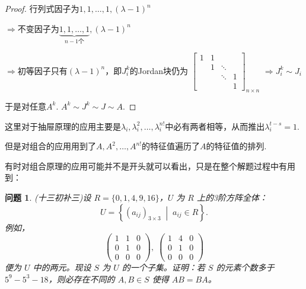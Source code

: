 \documentclass[12pt]{ctexart}  %
\newtheorem{question}{问题}[]
\begin{document}
\begin{proof}
行列式因子为$1,1,\dots,1,(\lambda-1)^n$

$\Rightarrow$不变因子为$\underbrace{1,1,\dots,1}_{n-1\text{个}},(\lambda-1)^n$

$\Rightarrow$初等因子只有$(\lambda-1)^n$，即$J_i^k$的Jordan块仍为
$\begin{bmatrix}
1 & 1 & & \\
& 1 & \ddots & \\
& & \ddots & 1 \\
& & & 1
\end{bmatrix}_{n\times n}$
$\Rightarrow J_i^k\sim J_i$

于是对任意$A^k$. $A^k\sim J^k\sim J\sim A$.


\end{proof}
这里对于抽屉原理的应用主要是$\lambda_i,\lambda_i^2,\dots,\lambda_i^{n!}$中必有两者相等，从而推出$\lambda_i^{t-s}=1$.

但是对组合的应用用到了$A,A^2,\dots,A^{n!}$的特征值遍历了$A$的特征值的排列.


有时对组合原理的应用可能并不是开头就可以看出，只是在整个解题过程中有用到：



\begin{question}
(十三初补三)设 \(R = \{0,1,4,9,16\}\)，\(U\) 为 \(R\) 上的3阶方阵全体：
\[
U = \left\{ (a_{ij})_{3\times 3} \;\middle|\; a_{ij} \in R \right\}.
\]
例如，
\[
\begin{pmatrix}
1 & 1 & 0 \\
0 & 1 & 0 \\
0 & 0 & 0
\end{pmatrix},\;
\begin{pmatrix}
1 & 4 & 0 \\
0 & 1 & 0 \\
0 & 0 & 0
\end{pmatrix}
\]
便为 \(U\) 中的两元。现设 \(S\) 为 \(U\) 的一个子集。证明：若 \(S\) 的元素个数多于 \(5^9 - 5^3 - 18\)，则必存在不同的 \(A,B \in S\) 使得 \(AB = BA\)。
\end{question}
\end{document}

